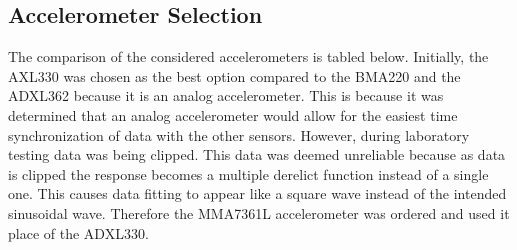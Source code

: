 \subsection{Accelerometer Selection}
\indent The comparison of the considered accelerometers is tabled below.  Initially, the AXL330 was chosen as the best option compared to the BMA220 and the ADXL362 because it is an analog accelerometer.  This is because it was determined that an analog accelerometer would allow for the easiest time synchronization of data with the other sensors.  However, during laboratory testing data was being clipped.  This data was deemed unreliable because as data is clipped the response becomes a multiple derelict function instead of a single one.  This causes data fitting to appear like a square wave instead of the intended sinusoidal wave.  Therefore the MMA7361L accelerometer was ordered and used it place of the ADXL330.  


